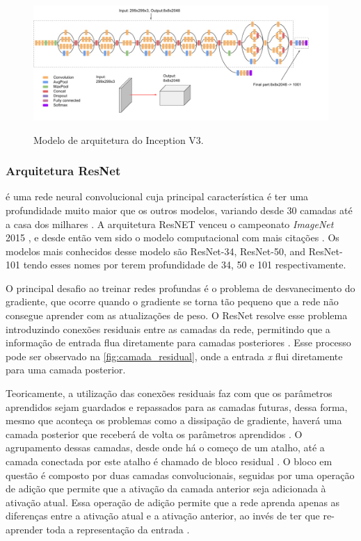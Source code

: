 \begin{figure}[htb]
    \centering
    \caption{Modelo de arquitetura do Inception V3.}
    \includegraphics[width=1\linewidth]{images/inceptionv3.jpg}
    \label{fig:inceptionv3}
\end{figure}



\subsubsection{Arquitetura ResNet}
 é uma rede neural convolucional cuja principal característica é ter uma profundidade muito maior que os outros modelos, variando desde 30 camadas até a casa dos milhares \cite{he2016deep}.
A arquitetura ResNET venceu o campeonato \textit{ImageNet} 2015 \cite{deng2009imagenet}, e desde então vem sido o modelo computacional com mais citações \cite{schmidhubermost}. 
Os modelos mais conhecidos desse modelo são ResNet-34, ResNet-50, and ResNet-101 tendo esses nomes por terem profundidade de 34, 50 e 101 respectivamente.

 O principal desafio ao treinar redes profundas é o problema de desvanecimento do gradiente, que ocorre quando o gradiente se torna tão pequeno que a rede não consegue aprender com as atualizações de peso. 
 O ResNet resolve esse problema introduzindo conexões residuais entre as camadas da rede, permitindo que a informação de entrada flua diretamente para camadas posteriores \cite{Vanshika2021}.
 Esse processo pode ser observado na \autoref{fig:camada_residual}, onde a entrada \textit{x} flui diretamente para uma camada posterior.

Teoricamente, a utilização das conexões residuais faz com que os parâmetros aprendidos sejam guardados e repassados para as camadas futuras, dessa forma, mesmo que aconteça os problemas como a dissipação de gradiente, haverá uma camada posterior que receberá de volta os parâmetros aprendidos \cite{Vanshika2021}. 
O agrupamento dessas camadas, desde onde há o começo de um atalho, até a camada conectada por este atalho é chamado de bloco residual \cite{he2016deep}.
O bloco em questão é composto por duas camadas convolucionais, seguidas por uma operação de adição que permite que a ativação da camada anterior seja adicionada à ativação atual. 
Essa operação de adição permite que a rede aprenda apenas as diferenças entre a ativação atual e a ativação anterior, ao invés de ter que re-aprender toda a representação da entrada \cite{he2016deep}.

